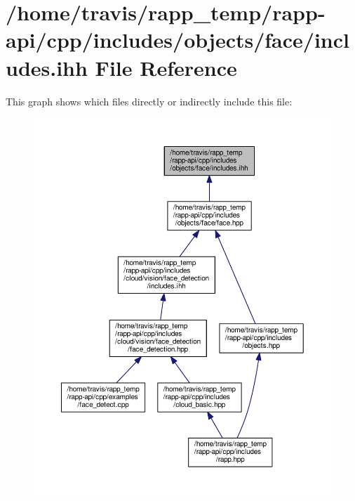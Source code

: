 \hypertarget{objects_2face_2includes_8ihh}{\section{/home/travis/rapp\-\_\-temp/rapp-\/api/cpp/includes/objects/face/includes.ihh File Reference}
\label{objects_2face_2includes_8ihh}
}
This graph shows which files directly or indirectly include this file\-:
\nopagebreak
\begin{figure}[H]
\begin{center}
\leavevmode
\includegraphics[width=350pt]{objects_2face_2includes_8ihh__dep__incl}
\end{center}
\end{figure}
